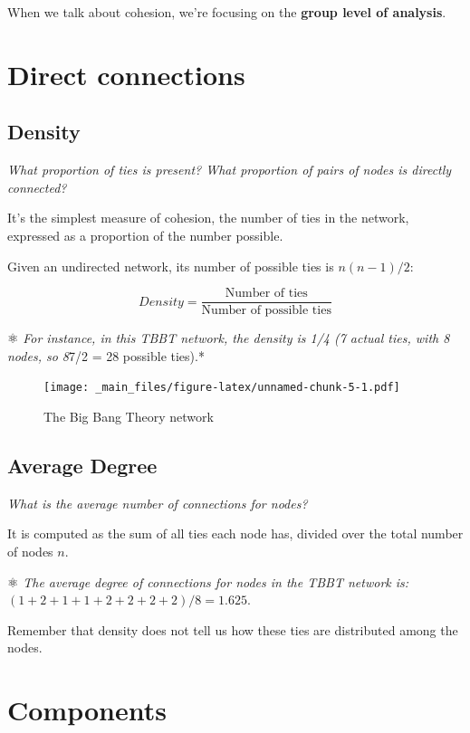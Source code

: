 \documentclass[
  notitlepage,
  onecolumn,
  openany]{book}
\begin{document}
When we talk about cohesion, we're focusing on the \textbf{group level of analysis}.

\hypertarget{direct-connections}{%
\section{Direct connections}\label{direct-connections}}

\hypertarget{density}{%
\subsection{Density}\label{density}}

\emph{What proportion of ties is present? What proportion of pairs of nodes is directly connected?}

It's the simplest measure of cohesion, the number of ties in the network, expressed as a proportion of the number possible.

Given an undirected network, its number of possible ties is \(n(n-1)/2\):

\[
Density = \frac{\text{Number of ties}}{\text{Number of possible ties}}
\]

⚛️ \emph{For instance, in this TBBT network, the density is 1/4 (7 actual ties, with 8 nodes, so 8}7/2 = 28 possible ties).*

\begin{figure}
\centering
\texttt{[image: \_main\_files/figure-latex/unnamed-chunk-5-1.pdf]}
\caption{\label{fig:unnamed-chunk-5}The Big Bang Theory network}
\end{figure}

\hypertarget{average-degree-1}{%
\subsection{Average Degree}\label{average-degree-1}}

\emph{What is the average number of connections for nodes?}

It is computed as the sum of all ties each node has, divided over the total number of nodes \(n\).

⚛️ \emph{The average degree of connections for nodes in the TBBT network is:} \((1+2+1+1+2+2+2+2)/8 = 1.625\).

Remember that density does not tell us how these ties are distributed among the nodes.

\hypertarget{components}{%
\section{Components}\label{components}}
\end{document}
